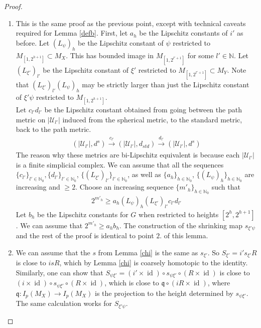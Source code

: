 \documentclass[a4paper,11pt]{article}
\theoremstyle{definition}
\theoremstyle{plain}
\theoremstyle{remark}
\DeclareMathOperator{\id}{id}
\begin{document}
{\begin{proof}
\begin{enumerate}
\item This is the same proof as the previous point, except with technical caveats required for Lemma  \ref{defb}. First, let $a_{h}$ be the Lipschitz constants of $i'$ as before. Let $(L_{\psi})_{h}$ be the Lipschitz constant of $\psi$ restricted to $M_{[1,2^{h+1}]}\subset M_{X}$. This has bounded image in $M_{[1,2^{l'+1}]}$ for some $l'\in \mathbb{N}$. Let $(L_{\xi'})_{l'}$ be the Lipschitz constant of $\xi'$ restricted to $M_{[1,2^{l'+1}]} \subset M_{Y}$. Note that $(L_{\xi'})_{l'}(L_{\psi})_{h}$ may be strictly larger than just the Lipschitz constant of $\xi'\psi$ restricted to $M_{[1,2^{h+1}]}$. \\

Let $c_{l'} d_{l'}$ be the Lipschitz constant obtained from going between the path metric on $|\mathcal{U}_{l'}|$ induced from the spherical metric, to the standard metric, back to the path metric.
\begin{align*}
(|\mathcal{U}_{l'}|,d^s) \xrightarrow{c_{l'}}(|\mathcal{U}_{l'}|,d_{std}) \xrightarrow{d_{l'}}(|\mathcal{U}_{l'}|,d^s)
\end{align*}
The reason why these metrics are bi-Lipschitz equivalent is because each $|\mathcal{U}_{l'}|$ is a finite simplicial complex. We can assume that all the sequences $\{c_{l'}\}_{l'\in \mathbb{N}_0}, \{d_{l'}\}_{l'\in \mathbb{N}_0}$, $\{(L_{\xi'})_{l'}\}_{l'\in \mathbb{N}_0}$, as well as $\{a_{h}\}_{h\in \mathbb{N}_0}$, $\{(L_{\psi})_{h}\}_{h\in \mathbb{N}_0}$ are increasing and $\geq 2$. Choose an increasing sequence $\{m'_{h}\}_{h\in \mathbb{N}_0}$ such that 
\begin{align*}
2^{m'_{h}} \geq a_{h}(L_{\psi})_{h}(L_{\xi'})_{l'}c_{l'}d_{l'}
\end{align*} 
Let $b_{h}$ be the Lipschitz constants for $G$ when restricted to heights $[2^h,2^{h+1}]$. We can assume that $2^{m'_{h}}\geq a_{h}b_{h}$. The construction of the shrinking map $s_{\xi'\psi}$ and the rest of the proof is identical to point $2$. of this lemma. 
\item We can assume that the $s$ from Lemma \ref{chi} is the same as $s_{\xi'}$. So $S_{\xi'}=i's_{\xi'}R$ is close to $isR$, which by Lemma \ref{chi} is coarsely homotopic to the identity. Similarly, one can show that $S_{\psi \xi'}=(i' \times \id) \circ s_{\psi \xi'}\circ (R\times \id)$ is close to $(i \times \id) \circ s_{\psi \xi'}\circ (R\times \id)$, which is close to $\mathfrak{q} \circ (i R\times \id)$, where $\mathfrak{q}: I_p(M_{X})\rightarrow I_{p}(M_{X})$ is the projection to the height determined by $s_{\psi \xi'}$. The same calculation works for $S_{\xi'\psi}$. 
\end{enumerate}
\end{proof}

}
\end{document}
